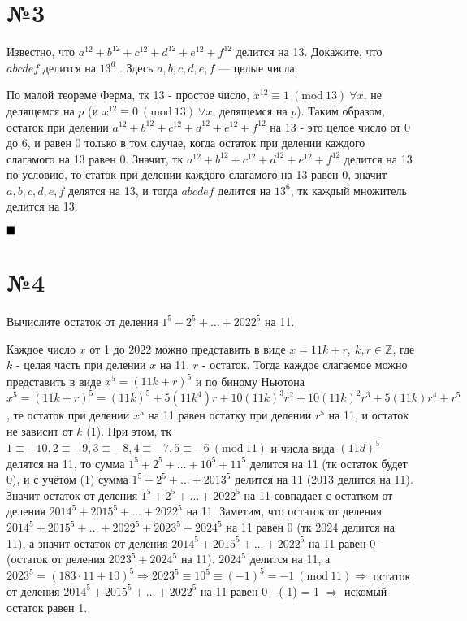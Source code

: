 \documentclass[a4paper, 16pt]{article}
\newcommand{\Z} {\mathbb{Z}}
\newcommand{\Mod}[1]{\ (\mathrm{mod}\ #1)}
\newenvironment{proof}[1][Доказательство]{%
	\begin{trivlist}
		\item[\hskip \labelsep {\bfseries #1:}]
		\item \hspace{14pt}
	}{
		$ \hfill\blacksquare $
	\end{trivlist}
	\hfill\break
}
\newenvironment{solution}[1][Решение]{%
	\begin{trivlist}
		\item[\hskip \labelsep {\bfseries #1:}]
		\item \hspace{15pt}
	}{
	\end{trivlist}
}
\begin{document}
	\section*{№3}
	
		Известно, что
		$a^{12} + b^{12} + c^{12} + d^{12} + e^{12} + f^{12}$
		делится на 13. Докажите, что
		$abcdef$
		делится на
		$13^6$
		.
		Здесь
		$a,b,c,d,e,f$
		— целые числа.
	
		\begin{proof}
			По малой теореме Ферма, тк 13 - простое число, $x^{12} \equiv 1 \Mod{13} \ \forall x$, не делящемся на $p$ (и $x^{12} \equiv 0 \Mod{13} \ \forall x$,  делящемся на $p$). Таким образом, остаток при делении $a^{12} + b^{12} + c^{12} + d^{12} + e^{12} + f^{12}$ на 13 - это целое число от 0 до 6, и равен 0 только в том случае, когда остаток при делении каждого слагамого на 13 равен 0. Значит, тк $a^{12} + b^{12} + c^{12} + d^{12} + e^{12} + f^{12}$
			делится на 13 по условию, то  статок при делении каждого слагамого на 13 равен 0, значит $a, b, c, d, e, f$ делятся на 13, и тогда $abcdef$
			делится на
			$13^6$, тк каждый множитель делится на 13.
		\end{proof}
	
	\section*{№4}
	
		Вычислите остаток от деления
		$1^5+ 2^5+ \dots+ 2022^5$
		на 11.
		
		\begin{solution}
			Каждое число $x$ от 1 до 2022 можно представить в виде $x = 11k + r, \ k, r \in \Z$, где $k$ - целая часть при делении $x$ на 11, $r$ - остаток. Тогда каждое слагаемое можно представить в виде $x^5 = (11k + r)^5$ и по биному Ньютона $x^5 = (11k + r)^5 = (11k)^5 + 5(11k^4)r + 10(11k)^3r^2+10(11k)^2r^3+5(11k)r^4+r^5$, те остаток при делении $x^5$ на 11 равен остатку при делении $r^5$ на 11, и остаток не зависит от $k$ (1). При этом, тк $1 \equiv -10, 2 \equiv -9,  3 \equiv -8,  4 \equiv -7,  5 \equiv -6 \Mod{11}$ и числа вида $(11d)^5$ делятся на 11, то сумма $1^5 + 2^5 + \dots + 10^5 + 11^5$ делится на 11 (тк остаток будет 0), и с учётом (1) сумма $1^5 + 2^5 + \dots + 2013^5$ делится на 11 (2013 делится на 11). Значит остаток от деления
			$1^5+ 2^5+ \dots+ 2022^5$
			на 11 совпадает с остатком от деления
			$2014^5+ 2015^5+ \dots+ 2022^5$
			на 11. Заметим, что остаток от деления
			$2014^5+ 2015^5+ \dots+ 2022^5 + 2023^5 + 2024^5$
			на 11 равен 0 (тк 2024 делится на 11), а значит остаток от деления
			$2014^5+ 2015^5+ \dots+ 2022^5$
			на 11 равен 0 - (остаток от деления $2023^5 + 2024^5$ на 11). $2024^5$ делится на 11, а $2023^5 = (183 \cdot 11 + 10)^5 \Rightarrow 2023^5 \equiv 10^5 \equiv (-1)^5 = -1 \Mod{11} \Rightarrow$ остаток от деления
			$2014^5+ 2015^5+ \dots+ 2022^5$
			на 11 равен 0 - (-1) = 1 $\Rightarrow$ искомый остаток равен 1.
		\end{solution}
	
\end{document}
